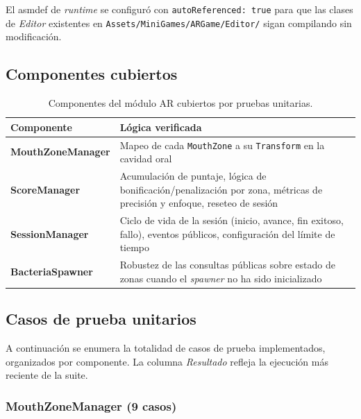 \documentclass[12pt, a4paper]{article}
\begin{document}
El asmdef de \textit{runtime} se configuró con \texttt{autoReferenced: true}
para que las clases de \textit{Editor} existentes en
\texttt{Assets/MiniGames/ARGame/Editor/} sigan compilando sin modificación.

\subsection{Componentes cubiertos}

\begin{table}[H]
  \centering
  \caption{Componentes del módulo AR cubiertos por pruebas unitarias.}
  \renewcommand{\arraystretch}{1.3}
  \begin{tabular}{>{\bfseries}p{4cm} p{8.5cm}}
    \toprule
    Componente & Lógica verificada \\
    \midrule
    MouthZoneManager & Mapeo de cada \texttt{MouthZone} a su \texttt{Transform}
                       en la cavidad oral \\
    ScoreManager     & Acumulación de puntaje, lógica de bonificación/penalización
                       por zona, métricas de precisión y enfoque, reseteo de sesión \\
    SessionManager   & Ciclo de vida de la sesión (inicio, avance, fin exitoso,
                       fallo), eventos públicos, configuración del límite de tiempo \\
    BacteriaSpawner  & Robustez de las consultas públicas sobre estado de zonas
                       cuando el \textit{spawner} no ha sido inicializado \\
    \bottomrule
  \end{tabular}
\end{table}

\subsection{Casos de prueba unitarios}

A continuación se enumera la totalidad de casos de prueba implementados,
organizados por componente. La columna \textit{Resultado} refleja la
ejecución más reciente de la suite.

\subsubsection{MouthZoneManager (9 casos)}
\end{document}
